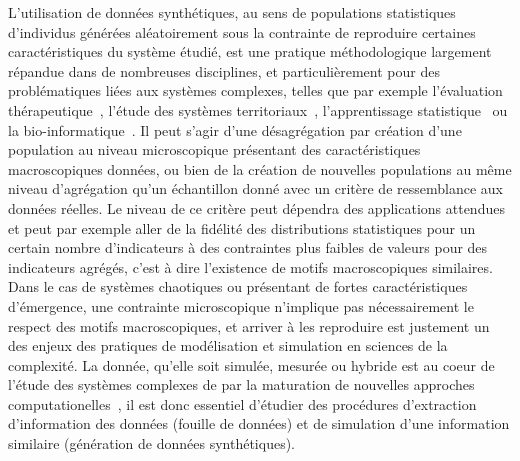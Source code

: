 {L'utilisation de données synthétiques, au sens de populations statistiques d'individus générées aléatoirement sous la contrainte de reproduire certaines caractéristiques du système étudié, est une pratique méthodologique largement répandue dans de nombreuses disciplines, et particulièrement pour des problématiques liées aux systèmes complexes, telles que par exemple l'évaluation thérapeutique~\cite{abadie2010synthetic}, l'étude des systèmes territoriaux~\cite{moeckel2003creating,pritchard2009advances}, l'apprentissage statistique~\cite{bolon2013review} ou la bio-informatique~\cite{van2006syntren}. Il peut s'agir d'une désagrégation par création d'une population au niveau microscopique présentant des caractéristiques macroscopiques données, ou bien de la création de nouvelles populations au même niveau d'agrégation qu'un échantillon donné avec un critère de ressemblance aux données réelles.  Le niveau de ce critère peut dépendra des applications attendues et peut par exemple aller de la fidélité des distributions statistiques pour un certain nombre d'indicateurs à des contraintes plus faibles de valeurs pour des indicateurs agrégés, c'est à dire l'existence de motifs macroscopiques similaires. Dans le cas de systèmes chaotiques ou présentant de fortes caractéristiques d'émergence, une contrainte microscopique n'implique pas nécessairement le respect des motifs macroscopiques, et arriver à les reproduire est justement un des enjeux des pratiques de modélisation et simulation en sciences de la complexité. La donnée, qu'elle soit simulée, mesurée ou hybride est au coeur de l'étude des systèmes complexes de par la maturation de nouvelles approches computationelles~\cite{arthur2015complexity}, il est donc essentiel d'étudier des procédures d'extraction d'information des données (fouille de données) et de simulation d'une information similaire (génération de données synthétiques).
}




